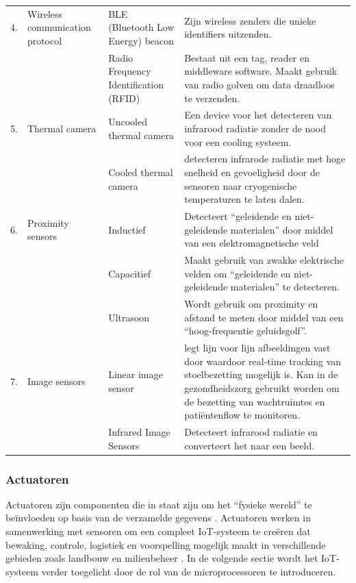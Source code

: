 \begin{table}[h]
\begin{tabular}{|c|m{3cm}|m{3.5cm}|m{7.5cm}|}
        \hline
        4. & Wireless communication protocol & BLE (Bluetooth Low Energy) beacon & Zijn wireless zenders die unieke identifiers uitzenden. \\
        & & Radio Frequency Identification (RFID) & Bestaat uit een tag, reader en middleware software. Maakt gebruik van radio golven om data draadloos te verzenden. \\
        \hline
        5. & Thermal camera & Uncooled thermal camera & Een device voor het detecteren van infrarood radiatie zonder de nood voor een cooling systeem. \\ & & Cooled thermal camera & detecteren infrarode radiatie met hoge snelheid en gevoeligheid door de sensoren naar cryogenische temperaturen te laten dalen. \\
        \hline
        6. & Proximity sensors & Inductief & Detecteert “geleidende en niet-geleidende materialen” door middel van een elektromagnetische veld  \\
        & & Capacitief & Maakt gebruik van zwakke elektrische velden om “geleidende en niet-geleidende materialen” te detecteren. \\
        & & Ultrasoon &  Wordt gebruik om proximity en afstand te meten door middel van een “hoog-frequentie geluidsgolf”.  \\
        \hline
        7. & Image sensors & Linear image sensor & legt lijn voor lijn afbeeldingen vast door waardoor real-time tracking van stoelbezetting mogelijk is. Kan in de gezondheidszorg gebruikt worden om de bezetting van wachtruimtes en patiëntenflow te monitoren.    \\
        & & Infrared Image Sensors & Detecteert infrarood radiatie en converteert het naar een beeld.\\
        \hline
    \end{tabular}
    \label{tab:sensor_subtypes}
\end{table}


\subsubsection{Actuatoren}
Actuatoren zijn componenten die in staat zijn om het “fysieke wereld” te beïnvloeden op basis van de verzamelde gegevens \autocite{Moyer2019}. Actuatoren werken in samenwerking met sensoren om een compleet IoT-systeem te creëren dat bewaking, controle, logistiek en voorspelling mogelijk maakt in verschillende gebieden zoals landbouw en milieubeheer \autocite{Talavera2017}. In de volgende sectie wordt het IoT-systeem verder toegelicht door de rol van de microprocessoren te introduceren.

